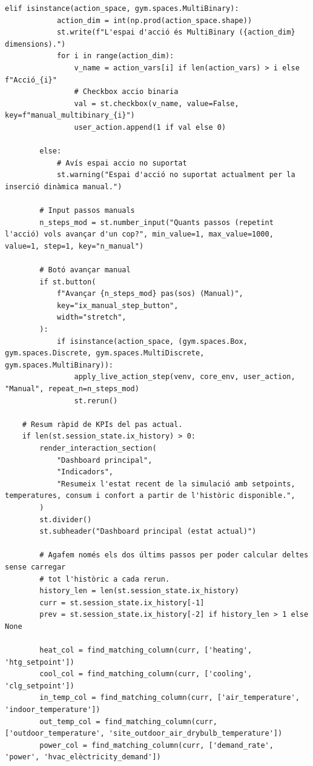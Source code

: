\documentclass[10pt,a4paper]{article}
\begin{document}
\begin{lstlisting}[style=studioPython,caption={pages/Interaccionar\_amb\_l'Agent.py},label={lst:pages-interaccionar-amb-l-agent-py}]
        elif isinstance(action_space, gym.spaces.MultiBinary):
            action_dim = int(np.prod(action_space.shape))
            st.write(f"L'espai d'acció és MultiBinary ({action_dim} dimensions).")
            for i in range(action_dim):
                v_name = action_vars[i] if len(action_vars) > i else f"Acció_{i}"
                # Checkbox accio binaria
                val = st.checkbox(v_name, value=False, key=f"manual_multibinary_{i}")
                user_action.append(1 if val else 0)

        else:
            # Avís espai accio no suportat
            st.warning("Espai d'acció no suportat actualment per la inserció dinàmica manual.")

        # Input passos manuals
        n_steps_mod = st.number_input("Quants passos (repetint l'acció) vols avançar d'un cop?", min_value=1, max_value=1000, value=1, step=1, key="n_manual")

        # Botó avançar manual
        if st.button(
            f"Avançar {n_steps_mod} pas(sos) (Manual)",
            key="ix_manual_step_button",
            width="stretch",
        ):
            if isinstance(action_space, (gym.spaces.Box, gym.spaces.Discrete, gym.spaces.MultiDiscrete, gym.spaces.MultiBinary)):
                apply_live_action_step(venv, core_env, user_action, "Manual", repeat_n=n_steps_mod)
                st.rerun()

    # Resum ràpid de KPIs del pas actual.
    if len(st.session_state.ix_history) > 0:
        render_interaction_section(
            "Dashboard principal",
            "Indicadors",
            "Resumeix l'estat recent de la simulació amb setpoints, temperatures, consum i confort a partir de l'històric disponible.",
        )
        st.divider()
        st.subheader("Dashboard principal (estat actual)")

        # Agafem només els dos últims passos per poder calcular deltes sense carregar
        # tot l'històric a cada rerun.
        history_len = len(st.session_state.ix_history)
        curr = st.session_state.ix_history[-1]
        prev = st.session_state.ix_history[-2] if history_len > 1 else None

        heat_col = find_matching_column(curr, ['heating', 'htg_setpoint'])
        cool_col = find_matching_column(curr, ['cooling', 'clg_setpoint'])
        in_temp_col = find_matching_column(curr, ['air_temperature', 'indoor_temperature'])
        out_temp_col = find_matching_column(curr, ['outdoor_temperature', 'site_outdoor_air_drybulb_temperature'])
        power_col = find_matching_column(curr, ['demand_rate', 'power', 'hvac_elèctricity_demand'])


\end{lstlisting}
\end{document}
